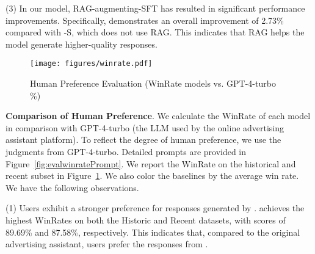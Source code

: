 (3) In our model, RAG-augmenting-SFT has resulted in significant performance improvements. Specifically, \ourmodel demonstrates an overall improvement of 2.73\% compared with \ourmodel-S, which does not use RAG. This indicates that RAG helps the model generate higher-quality responses. 



\begin{figure}[!t]
\centering
\texttt{[image: figures/winrate.pdf]}
    \caption{Human Preference Evaluation (WinRate models vs. GPT-4-turbo \%)}
    \label{fig:winrate}
\end{figure}


\textbf{Comparison of Human Preference}. 
We calculate the WinRate of each model in comparison with GPT-4-turbo (the LLM used by the online advertising assistant platform). To reflect the degree of human preference, we use the judgments from GPT-4-turbo. Detailed prompts
are provided in Figure~\ref{fig:evalwinratePrompt}. We report the WinRate on the historical and recent subset in Figure~\ref{fig:winrate}. We also color the baselines by the average win rate. We have the following observations.


(1) Users exhibit a stronger preference for responses generated by \ourmodel. \ourmodel achieves the highest WinRates on both the Historic and Recent datasets, with scores of 89.69\% and 87.58\%, respectively. This indicates that, compared to the original advertising assistant, users prefer the responses from \ourmodel. %

